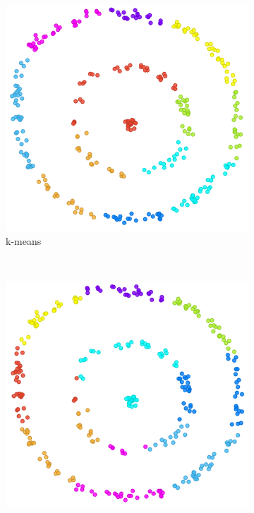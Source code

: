 \documentclass[conference]{IEEEtran}
\begin{document}
\begin{figure}[H]
    \centering
    \begin{subfigure}[c]{0.48\columnwidth}
        \includegraphics[width=\columnwidth]{results/circular_hc.png}
        \caption{k-means}
        \label{fig:synthetic_two_moons}
    \end{subfigure}
    ~
    \begin{subfigure}[c]{0.48\columnwidth}
        \includegraphics[width=\columnwidth]{results/circular_kmeans.png}

\end{subfigure}
\end{figure}
\end{document}
